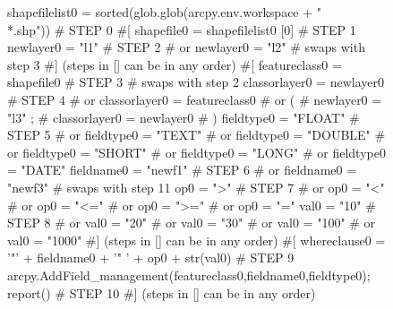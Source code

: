 \begin{figure}
{\scriptsize
\begin{code}
shapefilelist0 = sorted(glob.glob(arcpy.env.workspace + "\\*.shp"))         \textcolor{black!60}{\# STEP 0}
\textcolor{black!60}{\#[}
shapefile0 = shapefilelist0 [0]                                            \textcolor{black!60}{\# STEP 1}
newlayer0 = "l1"                                                           \textcolor{black!60}{\# STEP 2}
\textcolor{black!60}{\#  or newlayer0 = "l2" }
\textcolor{black!60}{\#  swaps with step 3}
\textcolor{black!60}{\#] (steps in [] can be in any order)}
\textcolor{black!60}{\#[}
featureclass0 = shapefile0                                                 \textcolor{black!60}{\# STEP 3}
\textcolor{black!60}{\#  swaps with step 2}
classorlayer0 = newlayer0                                                  \textcolor{black!60}{\# STEP 4}
\textcolor{black!60}{\#  or classorlayer0 = featureclass0 }
\textcolor{black!60}{\#  or (}
\textcolor{black!60}{\#      newlayer0 = "l3"  ;}
\textcolor{black!60}{\#      classorlayer0 = newlayer0 }
\textcolor{black!60}{\#     )}
fieldtype0 = "FLOAT"                                                       \textcolor{black!60}{\# STEP 5}
\textcolor{black!60}{\#  or fieldtype0 = "TEXT" }
\textcolor{black!60}{\#  or fieldtype0 = "DOUBLE" }
\textcolor{black!60}{\#  or fieldtype0 = "SHORT" }
\textcolor{black!60}{\#  or fieldtype0 = "LONG" }
\textcolor{black!60}{\#  or fieldtype0 = "DATE" }
fieldname0 = "newf1"                                                       \textcolor{black!60}{\# STEP 6}
\textcolor{black!60}{\#  or fieldname0 = "newf3" }
\textcolor{black!60}{\#  swaps with step 11}
op0 = ">"                                                                  \textcolor{black!60}{\# STEP 7}
\textcolor{black!60}{\#  or op0 = "<" }
\textcolor{black!60}{\#  or op0 = "<=" }
\textcolor{black!60}{\#  or op0 = ">=" }
\textcolor{black!60}{\#  or op0 = "=" }
val0 = "10"                                                                \textcolor{black!60}{\# STEP 8}
\textcolor{black!60}{\#  or val0 = "20" }
\textcolor{black!60}{\#  or val0 = "30" }
\textcolor{black!60}{\#  or val0 = "100" }
\textcolor{black!60}{\#  or val0 = "1000" }
\textcolor{black!60}{\#] (steps in [] can be in any order)}
\textcolor{black!60}{\#[}
whereclause0 = '"' + fieldname0 + '" ' + op0 + str(val0)                   \textcolor{black!60}{\# STEP 9}
arcpy.AddField\_management(featureclass0,fieldname0,fieldtype0); report()   \textcolor{black!60}{\# STEP 10}
\textcolor{black!60}{\#] (steps in [] can be in any order)}

\end{code}}
\end{figure}
